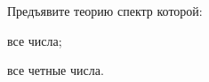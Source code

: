Предъявите теорию спектр которой:
\begin{enumcyr}
    \item все числа;
    \item все четные числа.
\end{enumcyr}